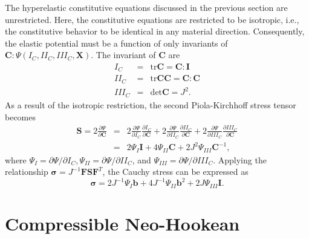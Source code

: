 \documentclass[12pt,aps,pre]{revtex4}
\begin{document}
The hyperelastic constitutive equations discussed in the previous section are unrestricted. Here, the constitutive equations are restricted to be isotropic, i.e., the constitutive behavior to be identical in any material direction. Consequently, the elastic potential must be a function of only invariants of $\pmb{C}: \Psi(I_C,II_C,III_C,\pmb{X})$. The invariant of $\pmb{C}$ are
%
\begin{eqnarray}
I_C &=& \text{tr}\pmb{C} = \pmb{C}:\pmb{I} \nonumber\\
II_C &=& \text{tr}\pmb{C}\pmb{C} = \pmb{C}:\pmb{C} \nonumber\\
III_C &=& \text{det}\pmb{C} = J^2 .
\label{eq:invariants}
\end{eqnarray}
%
As a result of the isotropic restriction, the second Piola-Kirchhoff stress tensor becomes
%
\begin{eqnarray}
\pmb{S} = 2\frac{\partial \Psi}{\partial \pmb{C}} &=& 2 \frac{\partial \Psi}{\partial I_C}\frac{\partial I_C}{\partial \pmb{C}} + 2\frac{\partial \Psi}{\partial II_C}\frac{\partial II_C}{\partial \pmb{C}} + 2\frac{\partial \Psi}{\partial III_C}\frac{\partial III_C}{\partial \pmb{C}} \nonumber\\
&=&2\Psi_I \pmb{I} + 4\Psi_{II} \pmb{C} + 2J^2\Psi_{III}\pmb{C}^{-1},
\end{eqnarray}
%
where $\Psi_I = \partial \Psi/\partial I_C, \Psi_{II} = \partial \Psi/\partial II_C$, and $\Psi_{III} = \partial \Psi/\partial III_C$. Applying the relationship $\pmb{\sigma} = J^{-1}\pmb{F}\pmb{S}\pmb{F}^T$, the Cauchy stress can be expressed as
%
\begin{equation}
\pmb{\sigma} = 2J^{-1}\Psi_I \pmb{b} + 4J^{-1}\Psi_{II} \pmb{b}^2 + 2J\Psi_{III} \pmb{I}.
\label{eq:sigma_isotropic}
\end{equation}


\section{Compressible Neo-Hookean}
\end{document}
